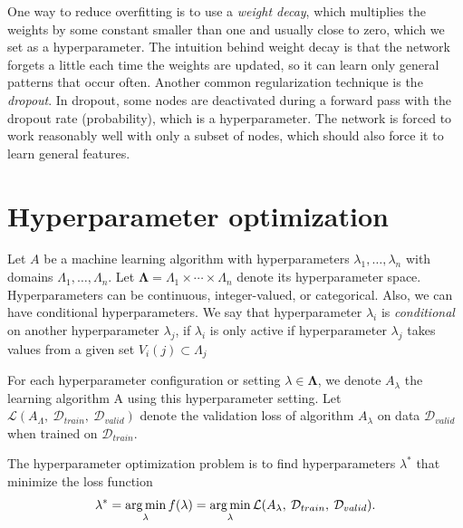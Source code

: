 One way to reduce overfitting is to use a \textit{weight decay}, which multiplies the weights by some constant smaller than one and usually close to zero, which we set as a hyperparameter. The intuition behind weight decay is that the network forgets a little each time the weights are updated, so it can learn only general patterns that occur often. Another common regularization technique is the \textit{dropout}. In dropout, some nodes are deactivated during a forward pass with the dropout rate (probability), which is a hyperparameter. The network is forced to work reasonably well with only a subset of nodes, which should also force it to learn general features.


\section{Hyperparameter optimization} \label{sec:hpo}

Let $A$ be a machine learning algorithm with hyperparameters $\lambda_1, \dots , \lambda_n$ with domains $\Lambda_1,\dots , \Lambda_n$. Let $ \mathbf{\Lambda } = \Lambda_1 \times \cdots \times \Lambda_n$ denote its hyperparameter space. Hyperparameters can be continuous, integer-valued, or categorical. Also, we can have conditional hyperparameters. We say that hyperparameter $\lambda_i$ is \emph{conditional} on another hyperparameter $\lambda_j$, if $\lambda_i$ is only active if hyperparameter $\lambda_j$ takes values from a given set $V_i(j) \subset \Lambda_j$

For each hyperparameter configuration or setting $\lambda \in \mathbf{\Lambda}$, we denote $A_\lambda$ the learning algorithm A using this hyperparameter setting. Let $\mathcal{L}(A_\Lambda, \: \mathcal{D}_{train}, \: \mathcal{D}_{valid})$ denote the validation loss of algorithm $A_\lambda$ on data $\mathcal{D}_{valid}$ when trained on $\mathcal{D}_{train}$.

\begin{defn}\label{defn:x}
The hyperparameter optimization problem is to find hyperparameters $\lambda^*$ that minimize the loss function  \[\lambda^*=\operatorname*{arg\,min} _\lambda f(\lambda)=\operatorname*{arg\,min}_\lambda \mathcal{L}(A_\lambda, \: \mathcal{D}_{train}, \:  \mathcal{D}_{valid}).\]
\end{defn}

